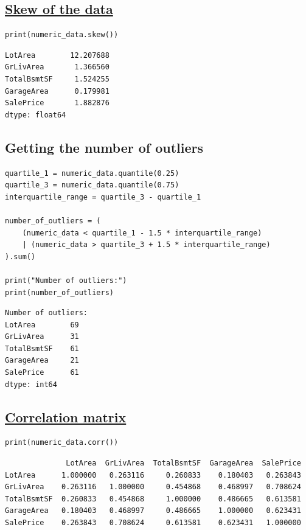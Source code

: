 \documentclass[11pt]{article}
\begin{document}
\subsection{\href{https://pandas.pydata.org/docs/reference/api/pandas.DataFrame.skew.html}{Skew of the data}}
\label{sec:org59c7e63}
\begin{verbatim}
print(numeric_data.skew())
\end{verbatim}

\label{org9fcd802}
\begin{verbatim}
LotArea        12.207688
GrLivArea       1.366560
TotalBsmtSF     1.524255
GarageArea      0.179981
SalePrice       1.882876
dtype: float64
\end{verbatim}


 \newpage
\subsection{Getting the number of outliers}
\label{sec:orgebb755e}
\begin{verbatim}
quartile_1 = numeric_data.quantile(0.25)
quartile_3 = numeric_data.quantile(0.75)
interquartile_range = quartile_3 - quartile_1

number_of_outliers = (
    (numeric_data < quartile_1 - 1.5 * interquartile_range)
    | (numeric_data > quartile_3 + 1.5 * interquartile_range)
).sum()

print("Number of outliers:")
print(number_of_outliers)
\end{verbatim}

\label{org1e0a979}
\begin{verbatim}
Number of outliers:
LotArea        69
GrLivArea      31
TotalBsmtSF    61
GarageArea     21
SalePrice      61
dtype: int64
\end{verbatim}
\subsection{\href{https://pandas.pydata.org/docs/reference/api/pandas.DataFrame.corr.html}{Correlation matrix}}
\label{sec:org5dd0c85}
\begin{verbatim}
print(numeric_data.corr())
\end{verbatim}

\label{orge6a94f8}
\begin{verbatim}
              LotArea  GrLivArea  TotalBsmtSF  GarageArea  SalePrice
LotArea      1.000000   0.263116     0.260833    0.180403   0.263843
GrLivArea    0.263116   1.000000     0.454868    0.468997   0.708624
TotalBsmtSF  0.260833   0.454868     1.000000    0.486665   0.613581
GarageArea   0.180403   0.468997     0.486665    1.000000   0.623431
SalePrice    0.263843   0.708624     0.613581    0.623431   1.000000
\end{verbatim}
\end{document}

